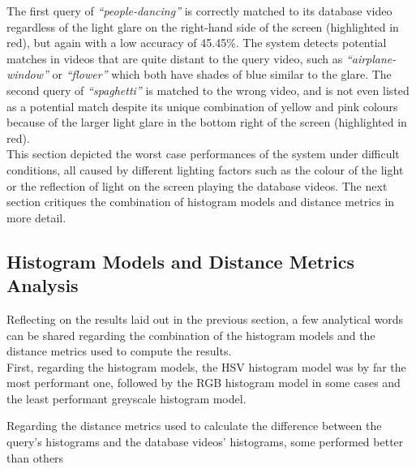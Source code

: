 The first query of \textit{``people-dancing''} is correctly matched to its database video regardless of the light glare on the right-hand side of the screen (highlighted in red), but again with a low accuracy of 45.45\%. The system detects potential matches in videos that are quite distant to the query video, such as \textit{``airplane-window''} or \textit{``flower''} which both have shades of blue similar to the glare. The second query of \textit{``spaghetti''} is matched to the wrong video, and is not even listed as a potential match despite its unique combination of yellow and pink colours because of the larger light glare in the bottom right of the screen (highlighted in red).\\

This section depicted the worst case performances of the system under difficult conditions, all caused by different lighting factors such as the colour of the light or the reflection of light on the screen playing the database videos. The next section critiques the combination of histogram models and distance metrics in more detail.


\subsection{Histogram Models and Distance Metrics Analysis}

Reflecting on the results laid out in the previous section, a few analytical words can be shared regarding the combination of the histogram models and the distance metrics used to compute the results.\\

First, regarding the histogram models, the HSV histogram model was by far the most performant one, followed by the RGB histogram model in some cases and the least performant greyscale histogram model. 

Regarding the distance metrics used to calculate the difference between the query's histograms and the database videos' histograms, some performed better than others

